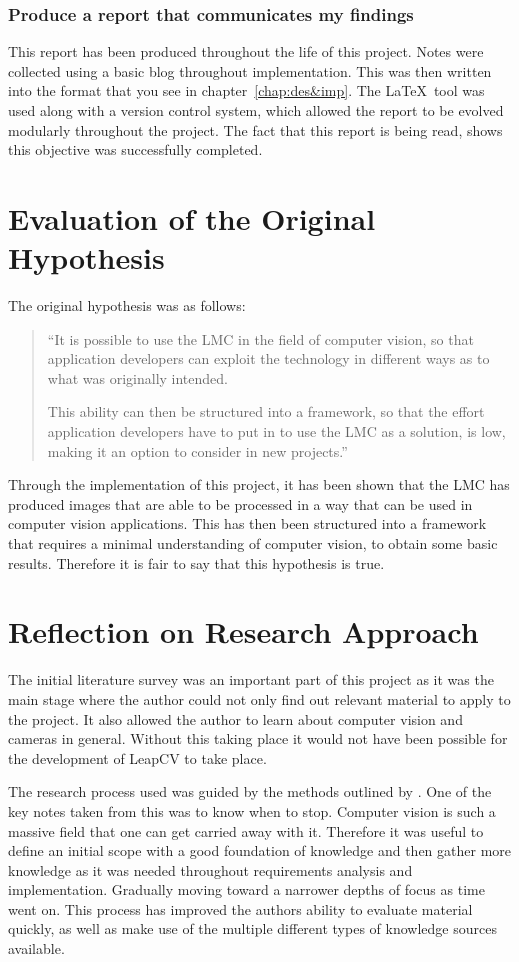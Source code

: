 \documentclass[11pt,oneside]{report}
\begin{document}
		\subsubsection{Produce a report that communicates my findings}
		This report has been produced throughout the life of this project.
		Notes were collected using a basic blog throughout implementation.
		This was then written into the format that you see in chapter~\ref{chap:des&imp}.
		The \LaTeX\ tool was used along with a version control system, which allowed the report to be evolved modularly throughout the project.
		The fact that this report is being read, shows this objective was successfully completed.
	
	\section{Evaluation of the Original Hypothesis}
	The original hypothesis was as follows:
	\begin{quote}
	``It is possible to use the LMC in the field of computer vision, so that application developers can exploit the technology in different ways as to what was originally intended.	
				
	This ability can then be structured into a framework, so that the effort application developers have to put in to use the LMC as a solution, is low, making it an option to consider in new projects.''
	\end{quote}
	
	Through the implementation of this project, it has been shown that the LMC has produced images that are able to be processed in a way that can be used in computer vision applications.
	This has then been structured into a framework that requires a minimal understanding of computer vision, to obtain some basic results.
	Therefore it is fair to say that this hypothesis is true.
	
	\section{Reflection on Research Approach}
		The initial literature survey was an important part of this project as it was the main stage where the author could not only find out relevant material to apply to the project.
		It also allowed the author to learn about computer vision and cameras in general.
		Without this taking place it would not have been possible for the development of LeapCV to take place.
		
		The research process used was guided by the methods outlined by .
		One of the key notes taken from this was to know when to stop.
		Computer vision is such a massive field that one can get carried away with it.
		Therefore it was useful to define an initial scope with a good foundation of knowledge and then gather more knowledge as it was needed throughout requirements analysis and implementation.
		Gradually moving toward a narrower depths of focus as time went on.
		This process has improved the authors ability to evaluate material quickly, as well as make use of the multiple different types of knowledge sources available.
\end{document}
